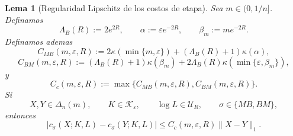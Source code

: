 ﻿\documentclass[12pt]{article}
\newtheorem{lema}{Lema}[section]
\begin{document}
\begin{lema}[Regularidad Lipschitz de los costos de etapa]\label{lem:lipschitz_costos_etapa_ordenados}
Sea \(m\in(0,1/n]\). Definamos
\[
\Lambda_B(R):=2e^{2R},
\qquad
\alpha:=\varepsilon e^{-2R},
\qquad
\beta_m:=me^{-2R}.
\]
Definamos ademas
\[
C_{MB}(m,\varepsilon,R)
:=
2\kappa(\min\{m,\varepsilon\})
+
(\Lambda_B(R)+1)\kappa(\alpha),
\]
\[
C_{BM}(m,\varepsilon,R)
:=
(\Lambda_B(R)+1)\kappa(\beta_m)
+
2\Lambda_B(R)\kappa(\min\{\varepsilon,\beta_m\}),
\]
y
\[
C_c(m,\varepsilon,R)
:=
\max\{C_{MB}(m,\varepsilon,R),C_{BM}(m,\varepsilon,R)\}.
\]
Si
\[
X,Y\in\Delta_n(m),
\qquad
K\in\mathcal K_\varepsilon,
\qquad
\log L\in\mathcal U_R,
\qquad
\sigma\in\{MB,BM\},
\]
entonces
\[
|c_\sigma(X;K,L)-c_\sigma(Y;K,L)|
\le
C_c(m,\varepsilon,R)\|X-Y\|_1.
\]
\end{lema}
\end{document}
